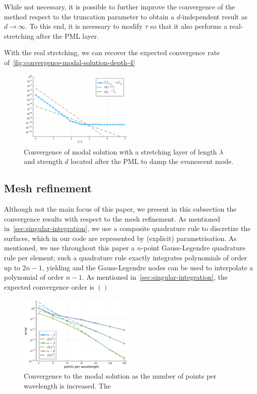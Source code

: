 \documentclass[11pt]{article}
\begin{document}
While not necessary, it is possible to further improve the convergence of the
method respect to the truncation parameter to obtain a $d$-independent result as
$d \to \infty$. To this end, it is necessary to modify $\tau$ so that it also
performs a real-stretching after the PML layer. 

With the real stretching, we can recover the expected convergence rate
of~\cref{fig:convergence-modal-solution-depth-4}
\begin{figure}
  \centering
  \includegraphics[width=0.5\textwidth]{figures/convergence_pml_stretching_planewave_depth_4.pdf}
  \caption{Convergence of modal solution with a stretching layer of length $\lambda$ and strength $d$ located after the PML to damp the evanescent mode. }
  \label{fig:pml-convergence-stretching-depth-4}
\end{figure}

\subsection{Mesh refinement}

Although not the main focus of this paper, we present in this subsection the
convergence results with respect to the mesh refinement. As mentioned
in~\cref{sec:singular-integration}, we use a composite quadrature rule to
discretize the surfaces, which in our code are represented by (explicit)
parametrisation. As mentioned, we use throughout this paper a $n$-point
Gauss-Legendre quadrature rule per element; such a quadrature rule exactly integrates
polynomials of order up to $2n-1$, yielding and the Gauss-Legendre nodes can be
used to interpolate a polynomial of order $n-1$. As mentioned
in~\cref{sec:singular-integration}, the expected convergence order is $()$


\begin{figure}
  \centering
  \includegraphics[width=0.5\textwidth]{figures/modal_convergence_meshsize_depth_1.pdf}
  \caption{Convergence to the modal solution as the number of points per wavelength is increased. The }
  \label{fig:mesh-convergence}
\end{figure}
\end{document}
